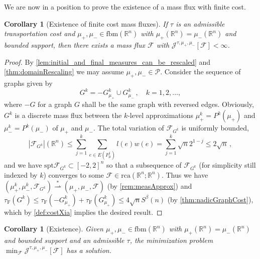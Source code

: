 \documentclass[10pt,a4paper,oneside,final]{article}
\newcommand{\R}{{\mathbb{R}}}
\newcommand{\rca}{\mathrm{rca}}
\newcommand{\fbm}{{\mathrm{fbm}}}
\newcommand{\prob}{{\mathcal{P}}}
\newcommand{\spt}{{\mathrm{spt}}}
\newcommand{\weakstarto}{\stackrel{*}{\rightharpoonup}}
\newcommand{\flux}{{\mathcal{F}}}
\newcommand{\JEn}{{\mathcal{J}}}
\newcommand{\JEnXia}[1][\tau]{#1_{\mathrm{F}}}%
\newcommand{\transportPath}{mass flux}
\newcommand{\transportPaths}{mass fluxes}
\numberwithin{equation}{section}
\theoremstyle{plain}
\newtheorem{corollary}[theorem]{Corollary}
\theoremstyle{definition}
\theoremstyle{remark}
\begin{document}
We are now in a position to prove the existence of a \transportPath{} with finite cost.

\begin{corollary}[Existence of finite cost \transportPaths{}]\label{thm:finiteCostGraph}
If $\tau$ is an admissible transportation cost and $\mu_+,\mu_-\in\fbm(\R^n)$ with $\mu_+(\R^n)=\mu_-(\R^n)$ and bounded support,
then there exists a \transportPath{} $\flux$ with $\JEn^{\tau,\mu_+,\mu_-}[\flux]<\infty$.
\end{corollary}
\begin{proof}
By \cref{lem:initial_and_final_measures_can_be_rescaled} and \cref{thm:domainRescaling} we may assume $\mu_+,\mu_-\in\prob$.
Consider the sequence of graphs given by
\begin{equation*}
G^k=-G_{\mu_+}^k\cup G_{\mu_-}^k\,,\quad k=1,2,\ldots,
\end{equation*}
where $-G$ for a graph $G$ shall be the same graph with reversed edges.
Obviously, $G^k$ is a discrete \transportPath{} between the $k$-level approximations $\mu_+^k=P^k(\mu_+)$ and $\mu_-^k=P^k(\mu_-)$ of $\mu_+$ and $\mu_-$.
The total variation of $\flux_{G^k}$ is uniformly bounded,
\begin{equation*}
|\flux_{G^k}|(\R^n)
\leq\sum_{j=1}^k\sum_{e\in E(F_{\mu}^j)}l(e)w(e)
=\sum_{j=1}^k\sqrt n2^{1-j}
\leq2\sqrt n\,,
\end{equation*}
and we have $\spt\flux_{G^k}\subset[-2,2]^n$
so that a subsequence of $\flux_{G^k}$ (for simplicity still indexed by $k$) converges to some $\flux\in\rca(\R^n;\R^n)$.
Thus we have $(\mu_+^k,\mu_-^k,\flux_{G^k})\weakstarto(\mu_+,\mu_-,\flux)$ (by \cref{rem:measApprox})
and $\JEnXia(G^k)\leq\JEnXia(-G_{\mu_+}^k)+\JEnXia(G_{\mu_+}^k)\leq4\sqrt nS^\beta(n)$ (by \cref{thm:nadicGraphCost}),
which by \cref{def:costXia} implies the desired result.
\end{proof}

\begin{corollary}[Existence]\label{thm:existenceFluxAdmissible}
Given $\mu_+,\mu_-\in\fbm(\R^n)$ with $\mu_+(\R^n)=\mu_-(\R^n)$ and bounded support and an admissible $\tau$, the minimization problem
$\min_\flux \JEn^{\tau,\mu_+,\mu_-}[\flux]$
has a solution.
\end{corollary}
\end{document}
